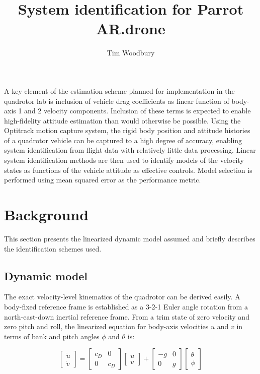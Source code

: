 \documentclass{aiaa-tc}
\title{System identification for Parrot AR.drone}
\author{Tim Woodbury}
\begin{document}
\maketitle

A key element of the estimation scheme planned for implementation in the quadrotor lab is inclusion of vehicle drag coefficients as linear function of body-axis 1 and 2 velocity components. Inclusion of these terms is expected to enable high-fidelity attitude estimation than would otherwise be possible. Using the Optitrack motion capture system, the rigid body position and attitude histories of a quadrotor vehicle can be captured to a high degree of accuracy, enabling system identification from flight data with relatively little data processing. Linear system identification methods are then used to identify models of the velocity states as functions of the vehicle attitude as effective controls. Model selection is performed using mean squared error as the performance metric.

\section{Background}

This section presents the linearized dynamic model assumed and briefly describes the identification schemes used.

\subsection{Dynamic model}

The exact velocity-level kinematics of the quadrotor can be derived easily. A body-fixed reference frame is established as a 3-2-1 Euler angle rotation from a north-east-down inertial reference frame. From a trim state of zero velocity and zero pitch and roll, the linearized equation for body-axis velocities $u$ and $v$ in terms of bank and pitch angles $\phi$ and $\theta$ is:

\begin{equation}
\begin{bmatrix}
\dot{u} \\
\dot{v}
\end{bmatrix} = \begin{bmatrix}
c_D & 0 \\ 0 & c_D
\end{bmatrix}
\begin{bmatrix}
u \\
v
\end{bmatrix}
+
\begin{bmatrix}
-g & 0 \\
0 & g
\end{bmatrix}
\begin{bmatrix}
\theta \\
\phi
\end{bmatrix}
\end{equation}
\end{document}
